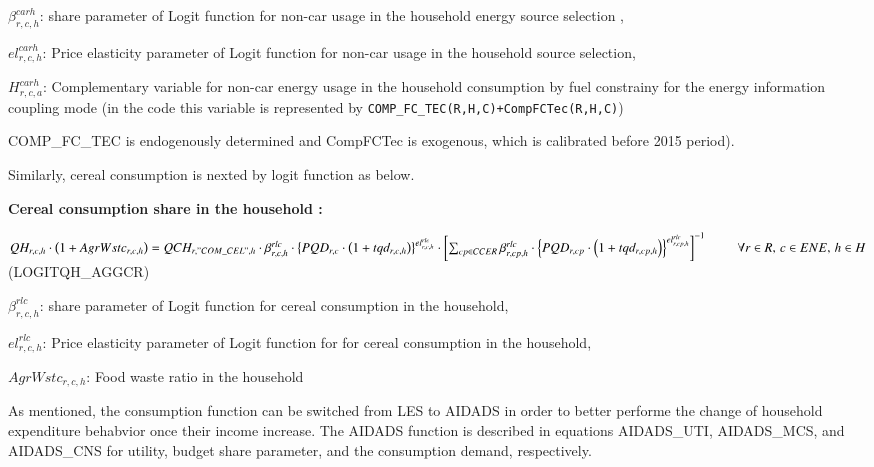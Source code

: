 \documentclass[10pt,a4paper,titlepage,dvipdfmx]{book}
\begin{document}
\begin{flushleft}
$\beta _{r,c,h}^{carh}$: share parameter of Logit function for non-car usage in the household energy source selection ,

$el_{r,c,h}^{carh}$: Price elasticity parameter of Logit function for non-car usage in the household source selection,

$H _{r,c,a}^{carh}$: Complementary variable for non-car energy usage in the household consumption by fuel constrainy for the energy information coupling mode (in the code this variable is represented by \texttt{COMP\_FC\_TEC(R,H,C)+CompFCTec(R,H,C)})
\end{flushleft}

COMP\_FC\_TEC  is endogenously determined and CompFCTec is exogenous, which is calibrated before 2015 period).

Similarly, cereal consumption is nexted by logit function as below.

\begin{flushleft}\textbf{Cereal consumption share in the household : }\end{flushleft}


\begin{center}$QH_{r,c,h}\cdot \left(1+AgrWstc_{r,c,h}\right)=QCH_{r,"COM\_ CEL",h}\cdot \beta _{r,c,h}^{rlc}\cdot \left\{PQD_{r,c}\cdot \left(1+tqd_{r,c,h}\right)\right\}^{el_{r,c,h}^{rlc}}\cdot \left[\sum _{cp\in CCER}\beta _{r,cp,h}^{rlc}\cdot \left\{PQD_{r,cp}\cdot \left(1+tqd_{r,cp,h}\right)\right\}^{el_{r,cp,h}^{rlc}}\right]^{-1}\,\,\,\,\,\,\,\,\,\,\,\,\,\,\forall r\in R,\,c\in ENE,\,h\in H$ (LOGITQH\_AGGCR)
\end{center}

\begin{flushleft}
$\beta _{r,c,h}^{rlc}$: share parameter of Logit function for cereal consumption in the household,

$el_{r,c,h}^{rlc}$: Price elasticity parameter of Logit function for for cereal consumption in the household,

$AgrWstc_{r,c,h}$: Food waste ratio in the household
\end{flushleft}

As mentioned, the consumption function can be switched from LES to AIDADS in order to better performe the change of household expenditure behabvior once their income increase. The AIDADS function is described in equations AIDADS\_UTI, AIDADS\_MCS, and AIDADS\_CNS for utility, budget share parameter, and the consumption demand, respectively.
\end{document}
